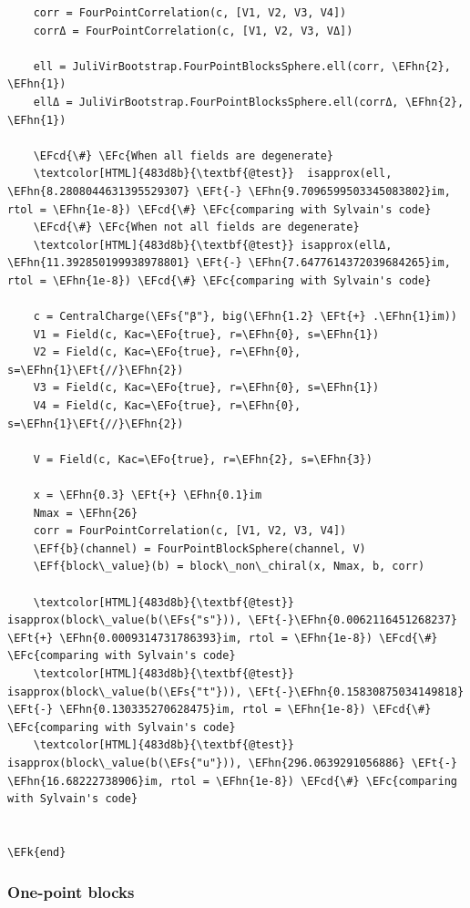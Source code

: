 \documentclass[a4paper]{article}
\numberwithin{equation}{section}
\newcommand{\EFc}[1]{\textcolor{EFc}{#1}} %
\newcommand{\EFcd}[1]{\textcolor{EFcd}{#1}} %
\newcommand{\EFs}[1]{\textcolor{EFs}{#1}} %
\newcommand{\EFk}[1]{\textcolor{EFk}{#1}} %
\newcommand{\EFf}[1]{\textcolor{EFf}{#1}} %
\newcommand{\EFt}[1]{\textcolor{EFt}{#1}} %
\newcommand{\EFo}[1]{\textcolor{EFo}{#1}} %
\newcommand{\EFhn}[1]{\textcolor{EFhn}{#1}} %
\begin{document}
\begin{itemize}
\begin{Code}
\begin{Verbatim}
    corr = FourPointCorrelation(c, [V1, V2, V3, V4])
    corrΔ = FourPointCorrelation(c, [V1, V2, V3, VΔ])

    ell = JuliVirBootstrap.FourPointBlocksSphere.ell(corr, \EFhn{2}, \EFhn{1})
    ellΔ = JuliVirBootstrap.FourPointBlocksSphere.ell(corrΔ, \EFhn{2}, \EFhn{1})

    \EFcd{\#} \EFc{When all fields are degenerate}
    \textcolor[HTML]{483d8b}{\textbf{@test}}  isapprox(ell, \EFhn{8.2808044631395529307} \EFt{-} \EFhn{9.7096599503345083802}im, rtol = \EFhn{1e-8}) \EFcd{\#} \EFc{comparing with Sylvain's code}
    \EFcd{\#} \EFc{When not all fields are degenerate}
    \textcolor[HTML]{483d8b}{\textbf{@test}} isapprox(ellΔ, \EFhn{11.392850199938978801} \EFt{-} \EFhn{7.6477614372039684265}im, rtol = \EFhn{1e-8}) \EFcd{\#} \EFc{comparing with Sylvain's code}

    c = CentralCharge(\EFs{"β"}, big(\EFhn{1.2} \EFt{+} .\EFhn{1}im))
    V1 = Field(c, Kac=\EFo{true}, r=\EFhn{0}, s=\EFhn{1})
    V2 = Field(c, Kac=\EFo{true}, r=\EFhn{0}, s=\EFhn{1}\EFt{//}\EFhn{2})
    V3 = Field(c, Kac=\EFo{true}, r=\EFhn{0}, s=\EFhn{1})
    V4 = Field(c, Kac=\EFo{true}, r=\EFhn{0}, s=\EFhn{1}\EFt{//}\EFhn{2})

    V = Field(c, Kac=\EFo{true}, r=\EFhn{2}, s=\EFhn{3})

    x = \EFhn{0.3} \EFt{+} \EFhn{0.1}im
    Nmax = \EFhn{26}
    corr = FourPointCorrelation(c, [V1, V2, V3, V4])
    \EFf{b}(channel) = FourPointBlockSphere(channel, V)
    \EFf{block\_value}(b) = block\_non\_chiral(x, Nmax, b, corr)

    \textcolor[HTML]{483d8b}{\textbf{@test}} isapprox(block\_value(b(\EFs{"s"})), \EFt{-}\EFhn{0.0062116451268237} \EFt{+} \EFhn{0.0009314731786393}im, rtol = \EFhn{1e-8}) \EFcd{\#} \EFc{comparing with Sylvain's code}
    \textcolor[HTML]{483d8b}{\textbf{@test}} isapprox(block\_value(b(\EFs{"t"})), \EFt{-}\EFhn{0.15830875034149818} \EFt{-} \EFhn{0.130335270628475}im, rtol = \EFhn{1e-8}) \EFcd{\#} \EFc{comparing with Sylvain's code}
    \textcolor[HTML]{483d8b}{\textbf{@test}} isapprox(block\_value(b(\EFs{"u"})), \EFhn{296.0639291056886} \EFt{-} \EFhn{16.68222738906}im, rtol = \EFhn{1e-8}) \EFcd{\#} \EFc{comparing with Sylvain's code}


\EFk{end}
\end{Verbatim}
\end{Code}
\end{itemize}
\subsubsection*{One-point blocks}
\label{sec:org1ed0323}
\end{document}
